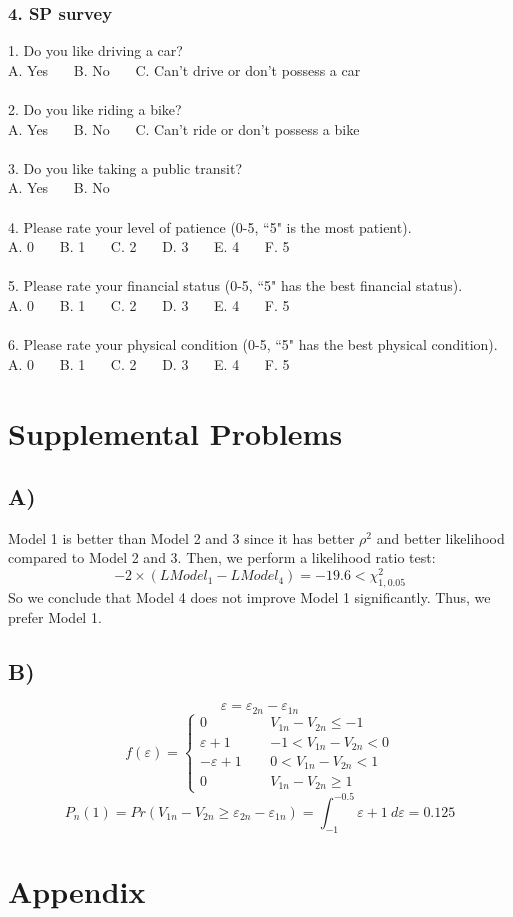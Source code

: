 \documentclass[11pt]{article}
\begin{document}
\subsubsection*{4. SP survey}
1. Do you like driving a car?\\
A. Yes \ \ \ B. No \ \ \ C. Can't drive or don't possess a car\\\\
2. Do you like riding a bike?\\
A. Yes \ \ \ B. No \ \ \ C. Can't ride or don't possess a bike\\\\
3. Do you like taking a public transit?\\
A. Yes \ \ \ B. No\\\\
4. Please rate your level of patience (0-5, ``5" is the most patient).\\
A. 0 \ \ \ B. 1 \ \ \ C. 2 \ \ \ D. 3 \ \ \ E. 4 \ \ \ F. 5\\\\
5. Please rate your financial status (0-5, ``5" has the best financial status).\\
A. 0 \ \ \ B. 1 \ \ \ C. 2 \ \ \ D. 3 \ \ \ E. 4 \ \ \ F. 5\\\\
6. Please rate your physical condition (0-5, ``5" has the best physical condition).\\
A. 0 \ \ \ B. 1 \ \ \ C. 2 \ \ \ D. 3 \ \ \ E. 4 \ \ \ F. 5
\newpage
\section{Supplemental Problems}
\subsection*{A)}
Model 1 is better than Model 2 and 3 since it has better $\rho^2$ and better likelihood compared to Model 2 and 3. Then, we perform a likelihood ratio test:
\begin{equation}
-2\times (LModel_1-LModel_4)=-19.6<\chi_{1,0.05}^2
\end{equation}
So we conclude that Model 4 does not improve Model 1 significantly. Thus, we prefer Model 1.
\subsection*{B)}
\begin{equation}
\varepsilon=\varepsilon_{2n}-\varepsilon_{1n}
\end{equation}
\begin{equation}
f(\varepsilon)=\left\{
\begin{array}{lll}
0&\ \ &V_{1n}-V_{2n}\leq-1\\
\varepsilon+1&\ \ &-1<V_{1n}-V_{2n}<0\\
-\varepsilon+1&\ \ &0<V_{1n}-V_{2n}<1\\
0&\ \ &V_{1n}-V_{2n}\geq 1
\end{array}
\right.
\end{equation}
\begin{equation}
P_n(1)=Pr(V_{1n}-V_{2n}\geq \varepsilon_{2n}-\varepsilon_{1n})=\int_{-1}^{-0.5}\varepsilon+1\ d\varepsilon=0.125
\end{equation}
\newpage
\section*{Appendix}\label{code}

\end{document}
